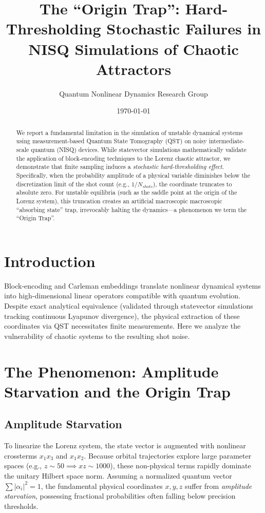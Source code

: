 \documentclass[11pt,a4paper]{article}
\title{The ``Origin Trap'': Hard-Thresholding Stochastic Failures in NISQ Simulations of Chaotic Attractors}
\author{Quantum Nonlinear Dynamics Research Group}
\date{\today}
\begin{document}
\maketitle

\begin{abstract}
We report a fundamental limitation in the simulation of unstable dynamical systems using measurement-based Quantum State Tomography (QST) on noisy intermediate-scale quantum (NISQ) devices. While statevector simulations mathematically validate the application of block-encoding techniques to the Lorenz chaotic attractor, we demonstrate that finite sampling induces a \textit{stochastic hard-thresholding effect}. Specifically, when the probability amplitude of a physical variable diminishes below the discretization limit of the shot count (e.g., $1/N_{shots}$), the coordinate truncates to absolute zero. For unstable equilibria (such as the saddle point at the origin of the Lorenz system), this truncation creates an artificial macroscopic macroscopic ``absorbing state'' trap, irrevocably halting the dynamics—a phenomenon we term the ``Origin Trap''.
\end{abstract}

\section{Introduction}
Block-encoding and Carleman embeddings translate nonlinear dynamical systems into high-dimensional linear operators compatible with quantum evolution. Despite exact analytical equivalence (validated through statevector simulations tracking continuous Lyapunov divergence), the physical extraction of these coordinates via QST necessitates finite measurements. Here we analyze the vulnerability of chaotic systems to the resulting shot noise.

\section{The Phenomenon: Amplitude Starvation and the Origin Trap}

\subsection{Amplitude Starvation}
To linearize the Lorenz system, the state vector is augmented with nonlinear crossterms $x_1 x_3$ and $x_1 x_2$. Because orbital trajectories explore large parameter spaces (e.g., $z \sim 50 \implies xz \sim 1000$), these non-physical terms rapidly dominate the unitary Hilbert space norm. Assuming a normalized quantum vector $\sum |\alpha_i|^2 = 1$, the fundamental physical coordinates $x, y, z$ suffer from \textit{amplitude starvation}, possessing fractional probabilities often falling below precision thresholds.
\end{document}
